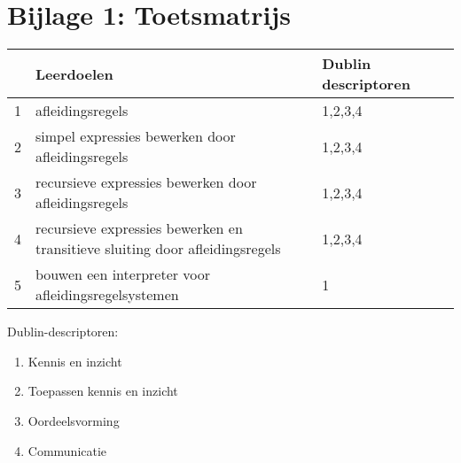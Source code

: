 \section*{Bijlage 1: Toetsmatrijs}
	\begin{tabular}{|p{1cm}|p{4cm}|p{4cm}|p{4cm}|}
		\hline
		& Leerdoelen & Dublin descriptoren \\
		\hline
		1 & afleidingsregels & 1,2,3,4 \\
		\hline
		2 & simpel expressies bewerken door afleidingsregels & 1,2,3,4 \\
		\hline
		3 & recursieve expressies bewerken door afleidingsregels & 1,2,3,4 \\
		\hline
		4 & recursieve expressies bewerken en transitieve sluiting door afleidingsregels & 1,2,3,4 \\
		\hline
		5 & bouwen een interpreter voor afleidingsregelsystemen & 1 \\
		\hline
	\end{tabular}
	
	\vspace{1cm}

	Dublin-descriptoren:
	\begin{enumerate}
		\item Kennis en inzicht
		\item Toepassen kennis en inzicht
		\item Oordeelsvorming
		\item Communicatie
	\end{enumerate}
